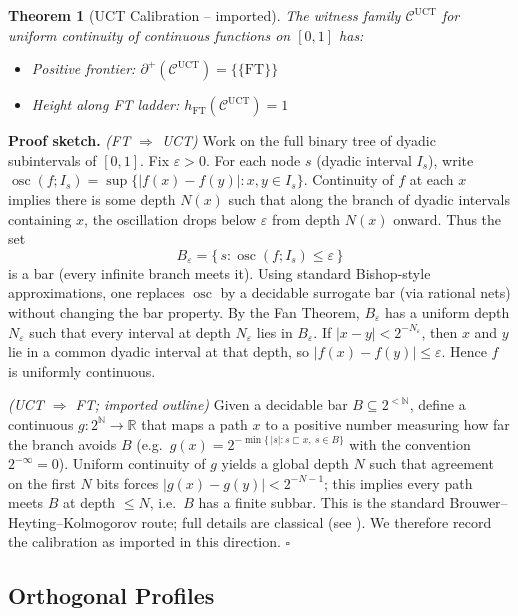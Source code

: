 \documentclass[11pt]{article}
\newtheorem{theorem}{Theorem}[section]
\newenvironment{proof}[1][Proof]{\noindent\textbf{#1.}\hspace{0.5em}}{\hfill$\square$\par}
\newcommand{\N}{\mathbb{N}}
\newcommand{\R}{\mathbb{R}}
\newcommand{\FT}{\mathrm{FT}}
\newcommand{\Frontierpos}{\partial^{+}}
\newcommand{\UCT}{\mathrm{UCT}}
\begin{document}
\begin{theorem}[UCT Calibration -- imported]\label{thm:uct-calib}
The witness family $\mathcal{C}^{\UCT}$ for uniform continuity of continuous functions on $[0,1]$ has:
\begin{itemize}
\item Positive frontier: $\Frontierpos(\mathcal{C}^{\UCT}) = \{\{\FT\}\}$
\item Height along FT ladder: $h_{\FT}(\mathcal{C}^{\UCT}) = 1$
\end{itemize}
\end{theorem}

\begin{proof}[Proof sketch]
\emph{(FT $\Rightarrow$ UCT)} Work on the full binary tree of dyadic subintervals of $[0,1]$.
Fix $\varepsilon>0$. For each node $s$ (dyadic interval $I_s$), write
$\operatorname{osc}(f;I_s)=\sup\{|f(x)-f(y)|:x,y\in I_s\}$.
Continuity of $f$ at each $x$ implies there is some depth $N(x)$ such that along the branch of
dyadic intervals containing $x$, the oscillation drops below $\varepsilon$ from depth $N(x)$ onward.
Thus the set
\[
B_\varepsilon=\{\,s:\operatorname{osc}(f;I_s)\le\varepsilon\,\}
\]
is a bar (every infinite branch meets it). Using standard Bishop-style approximations, one replaces
$\operatorname{osc}$ by a decidable surrogate bar (via rational nets) without changing the bar
property. By the Fan Theorem, $B_\varepsilon$ has a uniform depth $N_\varepsilon$ such that every
interval at depth $N_\varepsilon$ lies in $B_\varepsilon$. If $|x-y|<2^{-N_\varepsilon}$, then $x$
and $y$ lie in a common dyadic interval at that depth, so $|f(x)-f(y)|\le\varepsilon$. Hence $f$ is
uniformly continuous.

\smallskip
\emph{(UCT $\Rightarrow$ FT; imported outline)} Given a decidable bar $B\subseteq 2^{<\N}$, define a
continuous $g:2^\N\to\R$ that maps a path $x$ to a positive number measuring how far the branch
avoids $B$ (e.g.\ $g(x)=2^{-\min\{\,|s|:s\sqsubset x,\ s\in B\}}$ with the convention $2^{-\infty}=0$).
Uniform continuity of $g$ yields a global depth $N$ such that agreement on the first $N$ bits forces
$|g(x)-g(y)|<2^{-N-1}$; this implies every path meets $B$ at depth $\le N$, i.e.\ $B$ has a finite
subbar. This is the standard Brouwer--Heyting--Kolmogorov route; full details are classical (see
\cite{bridges2007}). We therefore record the calibration as imported in this direction.
\end{proof}

\subsection{Orthogonal Profiles}
\end{document}

